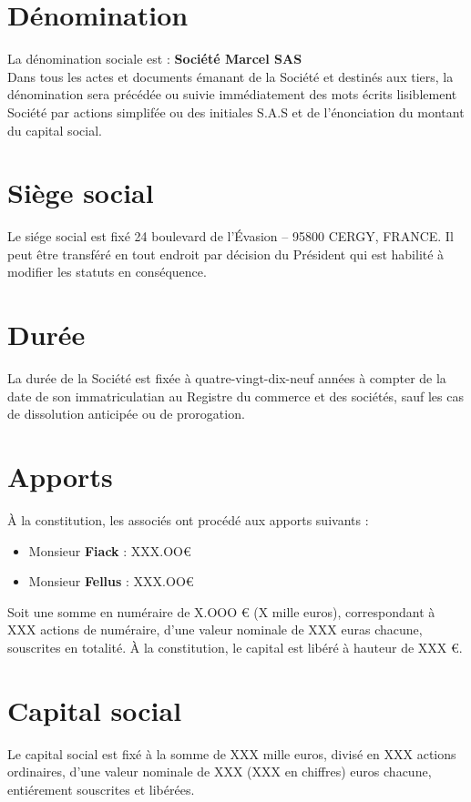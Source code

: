 \documentclass[a4paper,12pt]{report}
\newcommand{\address}{24 boulevard de l'Évasion -- 95800 CERGY, FRANCE}
\begin{document}
\section{Dénomination}
La dénomination sociale est : \og \textbf{Société Marcel SAS} \fg{}\\
Dans tous les actes et documents émanant de la Société et destinés aux tiers, 
la dénomination sera précédée ou suivie immédiatement des mots écrits lisiblement \og Société par actions simplifée \fg{} 
ou des initiales \og S.A.S \fg{} et de l'énonciation du montant du capital social.

\section{Siège social}
Le siége social est fixé \address. 
Il peut être transféré en tout endroit par décision du Président qui est habilité à modifier les statuts en conséquence.

\section{Durée}
La durée de la Société est fixée à quatre-vingt-dix-neuf années à compter de la date de son immatriculatian au Registre du commerce et des sociétés, 
sauf les cas de dissolution anticipée ou de prorogation.

\section{Apports}
À la constitution, les associés ont procédé aux apports suivants :
\begin{itemize}
	\item Monsieur \textbf{Fiack} :         XXX.OO€
	\item Monsieur \textbf{Fellus} :         XXX.OO€
\end{itemize}

Soit une somme en numéraire de X.OOO € (X mille euros), correspondant à XXX actions de numéraire, d'une valeur nominale de XXX euras chacune, souscrites en totalité. 
À la constitution, le capital est libéré à hauteur de XXX €.

\section{Capital social}
Le capital social est fixé à la somme de XXX mille euros, divisé en XXX actions ordinaires,
d'une valeur nominale de XXX (XXX en chiffres) euros chacune, entiérement souscrites et libérées.
\end{document}
